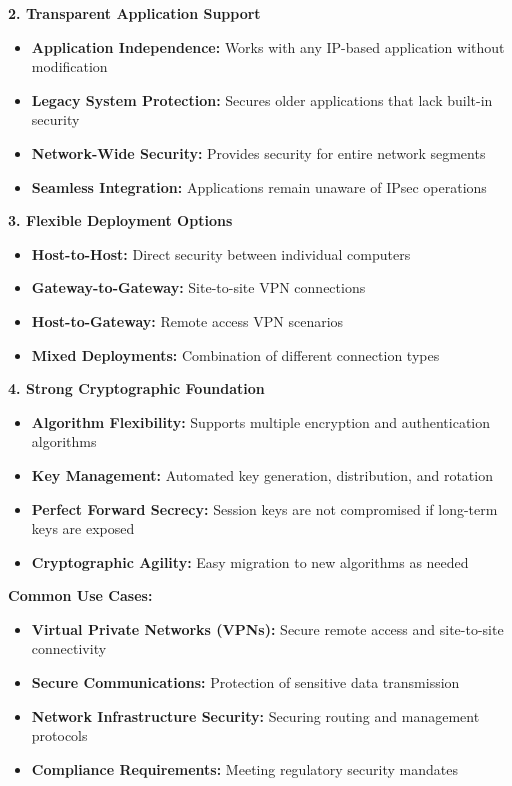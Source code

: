 \documentclass[12pt,a4paper]{article}
\begin{document}
\textbf{2. Transparent Application Support}
\begin{itemize}
    \item \textbf{Application Independence:} Works with any IP-based application without modification
    \item \textbf{Legacy System Protection:} Secures older applications that lack built-in security
    \item \textbf{Network-Wide Security:} Provides security for entire network segments
    \item \textbf{Seamless Integration:} Applications remain unaware of IPsec operations
\end{itemize}

\textbf{3. Flexible Deployment Options}
\begin{itemize}
    \item \textbf{Host-to-Host:} Direct security between individual computers
    \item \textbf{Gateway-to-Gateway:} Site-to-site VPN connections
    \item \textbf{Host-to-Gateway:} Remote access VPN scenarios
    \item \textbf{Mixed Deployments:} Combination of different connection types
\end{itemize}

\textbf{4. Strong Cryptographic Foundation}
\begin{itemize}
    \item \textbf{Algorithm Flexibility:} Supports multiple encryption and authentication algorithms
    \item \textbf{Key Management:} Automated key generation, distribution, and rotation
    \item \textbf{Perfect Forward Secrecy:} Session keys are not compromised if long-term keys are exposed
    \item \textbf{Cryptographic Agility:} Easy migration to new algorithms as needed
\end{itemize}

\textbf{Common Use Cases:}
\begin{itemize}
    \item \textbf{Virtual Private Networks (VPNs):} Secure remote access and site-to-site connectivity
    \item \textbf{Secure Communications:} Protection of sensitive data transmission
    \item \textbf{Network Infrastructure Security:} Securing routing and management protocols
    \item \textbf{Compliance Requirements:} Meeting regulatory security mandates
\end{itemize}
\end{document}
